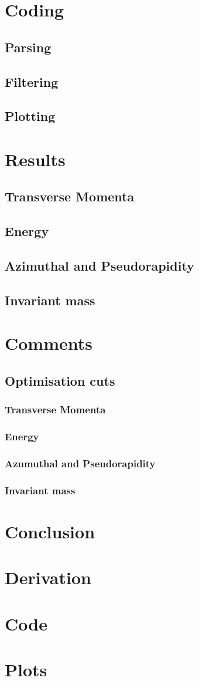 \documentclass{article}
\begin{document}
\section{Coding}
\subsection{Parsing}
\subsection{Filtering}
\subsection{Plotting}
\section{Results}
\subsection{Transverse Momenta}
\subsection{Energy}
\subsection{Azimuthal and Pseudorapidity}
\subsection{Invariant mass}
\section{Comments}
\subsection{Optimisation cuts}
\subsubsection{Transverse Momenta}
\subsubsection{Energy}
\subsubsection{Azumuthal and Pseudorapidity}
\subsubsection{Invariant mass}
\section{Conclusion}


\appendix
\section{Derivation}
\section{Code}
\section{Plots}
\end{document}
